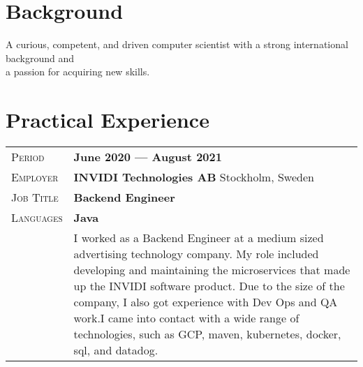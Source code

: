 \documentclass[a4paper, oneside, final]{scrartcl} %
\newcommand{\gray}{\rowcolor[gray]{.90}} %
\begin{document}
\begin{center} %


{\fontsize{36}{36}\selectfont\scshape{}} %

\vspace{1.5cm} %


\section{Background}

A curious, competent, and driven computer scientist with a strong international background and \\ a passion for acquiring new skills.


\section{Practical Experience}

\begin{tabularx}{0.97\linewidth}{>{\raggedleft\scshape}p{2cm}X}
\gray Period & \textbf{June 2020 --- August 2021}\\
\gray Employer & \textbf{INVIDI Technologies AB} \hfill Stockholm, Sweden\\
\gray Job Title & \textbf{Backend Engineer}\\
\gray Languages & \textbf{Java}\\
       & I worked as a Backend Engineer at a medium sized advertising technology company. My role included developing and maintaining the microservices that made up the INVIDI software product. Due to the size of the company, I also got experience with Dev Ops and QA work.I came into contact with a wide range of technologies, such as GCP, maven, kubernetes, docker, sql, and datadog.
\end{tabularx}


\end{center}
\end{document}
